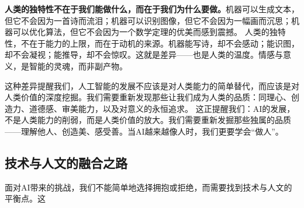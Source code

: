 {\bf 人类的独特性不在于我们能做什么，而在于我们为什么要做。}机器可以生成文本，但它不会因为一首诗而流泪；机器可以识别图像，但它不会因为一幅画而沉思；机器可以优化算法，但它不会因为一个数学定理的优美而感到震撼。
人类的独特性，不在于能力的上限，而在于动机的来源。机器能写诗，却不会感动；能识图，却不会凝视；能推导，却不会惊叹。这就是差异——也是人类的温度。情感与意义，是智能的灵魂，而非副产物。

这种差异提醒我们，人工智能的发展不应该是对人类能力的简单替代，而应该是对人类价值的深度挖掘。我们需要重新发现那些让我们成为人类的品质：同理心、创造力、道德感、审美能力，以及对意义的永恒追求。
这正提醒我们：AI的发展，不是人类能力的削弱，而是人类价值的放大。我们需要重新发掘那些独属的品质——理解他人、创造美、感受善。当AI越来越像人时，我们更要学会“做人”。

\subsection*{技术与人文的融合之路}

面对AI带来的挑战，我们不能简单地选择拥抱或拒绝，而需要找到技术与人文的平衡点。这





